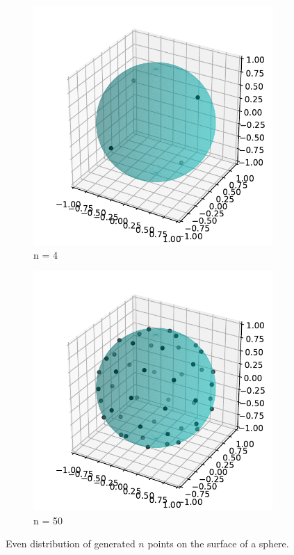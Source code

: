\documentclass[a4paper, 12pt]{article}
\begin{document}
\begin{figure}[!ht]
	\centering
	\begin{subfigure}{.5\textwidth}
		\centering
		\includegraphics[scale=0.7]{../images/generated2.pdf}
		\caption{n = 4}
	\end{subfigure}%
	\begin{subfigure}{.5\textwidth}
		\centering
		\includegraphics[scale=0.7]{../images/generated1.pdf}
		\caption{n = 50}
	\end{subfigure}%
    \caption{Even distribution of generated $n$ points on the surface of a sphere.}
	\label{generated}
\end{figure}
\end{document}
